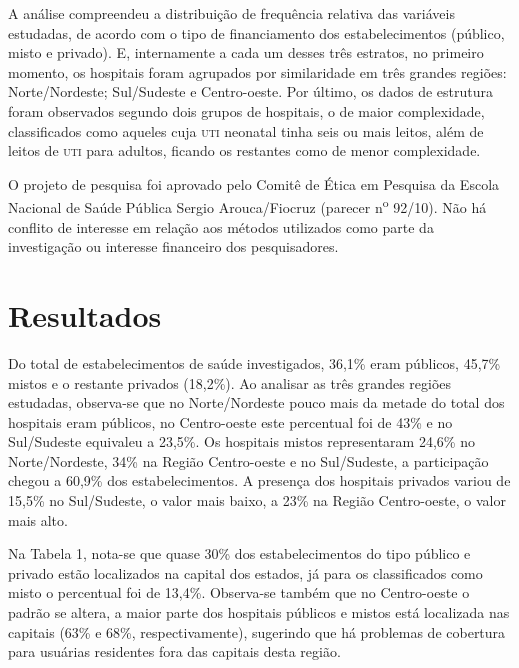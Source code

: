 \documentclass{article}
\begin{document}
A análise compreendeu a distribuição de frequência relativa das variáveis
estudadas,
de acordo com o tipo de financiamento dos estabelecimentos (público, misto e
privado). E, internamente a cada um desses três estratos, no primeiro momento,
os
hospitais foram agrupados por similaridade em três grandes regiões:
Norte/Nordeste;
Sul/Sudeste e Centro-oeste. Por último, os dados de estrutura foram observados
segundo dois grupos de hospitais, o de maior complexidade, classificados como
aqueles cuja \textsc{uti} neonatal tinha seis ou mais leitos, além de leitos de \textsc{uti} para
adultos, ficando os restantes como de menor complexidade.

O projeto de pesquisa foi aprovado pelo Comitê de Ética em Pesquisa da Escola
Nacional de Saúde Pública Sergio Arouca/Fiocruz (parecer
n\textsuperscript{o}
92/10). Não há conflito de interesse em
relação aos métodos utilizados como parte da investigação ou interesse
financeiro
dos pesquisadores.

\section{Resultados}

Do total de estabelecimentos de saúde investigados, 36,1\% eram públicos, 45,7\%
mistos
e o restante privados (18,2\%). Ao analisar as três grandes regiões estudadas,
observa-se que no Norte/Nordeste pouco mais da metade do total dos hospitais
eram
públicos, no Centro-oeste este percentual foi de 43\% e no Sul/Sudeste equivaleu
a
23,5\%. Os hospitais mistos representaram 24,6\% no Norte/Nordeste, 34\% na
Região
Centro-oeste e no Sul/Sudeste, a participação chegou a 60,9\% dos
estabelecimentos. A
presença dos hospitais privados variou de 15,5\% no Sul/Sudeste, o valor mais
baixo,
a 23\% na Região Centro-oeste, o valor mais alto.

Na Tabela 1, nota-se que quase 30\% dos
estabelecimentos do tipo público e privado estão localizados na capital dos
estados,
já para os classificados como misto o percentual foi de 13,4\%. Observa-se
também que
no Centro-oeste o padrão se altera, a maior parte dos hospitais públicos e
mistos
está localizada nas capitais (63\% e 68\%, respectivamente), sugerindo que há
problemas de cobertura para usuárias residentes fora das capitais desta região.
\end{document}
